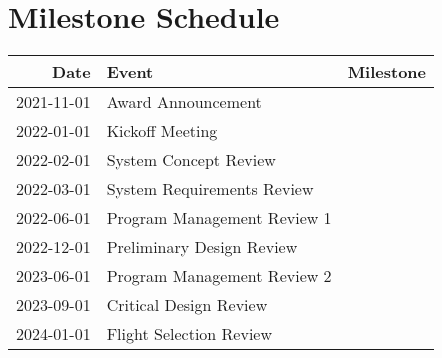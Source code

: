 \section{Milestone Schedule}

\begin{tabular}{rll}
\hline
Date & Event & Milestone\\
\hline
2021-11-01 & Award Announcement & \\
2022-01-01 & Kickoff Meeting & \\
2022-02-01 & System Concept Review & \\
2022-03-01 & System Requirements Review & \\
2022-06-01 & Program Management Review 1 & \\
2022-12-01 & Preliminary Design Review & \\
2023-06-01 & Program Management Review 2 & \\
2023-09-01 & Critical Design Review & \\
2024-01-01 & Flight Selection Review & \\
\hline
\end{tabular}

